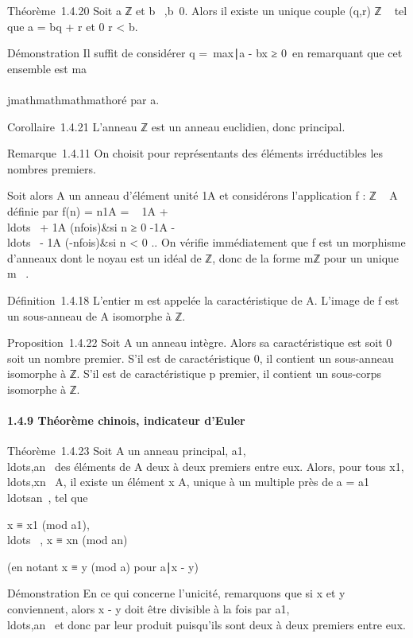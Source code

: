Théorème~1.4.20 Soit a \in ℤ et b \in {}~,b\neq~0. Alors il existe un unique
couple (q,r) \in ℤ \times {}~ tel que a = bq + r et 0 \leq r \textless{} b.

Démonstration Il suffit de considérer q =\
max\x∣a - bx ≥
0\ en remarquant que cet ensemble est ma\\\\jmathmathmathmathoré par a.

Corollaire~1.4.21 L'anneau ℤ est un anneau euclidien, donc principal.

Remarque~1.4.11 On choisit pour représentants des éléments irréductibles
les nombres premiers.

Soit alors A un anneau d'élément unité 1A et considérons
l'application f : ℤ \rightarrow~ A définie par f(n) = n1A =
\left \ \cases
1A +
\\ldots~ +
1A (n\text fois)&si n ≥ 0
\cr -1A
-\\ldots~ -
1A (-n\text fois)&si n \textless{} 0 
\right .. On vérifie immédiatement que f est un morphisme
d'anneaux dont le noyau est un idéal de ℤ, donc de la forme mℤ pour un
unique m \in \mathbb{N}~.

Définition~1.4.18 L'entier m est appelée la caractéristique de A.
L'image de f est un sous-anneau de A isomorphe à ℤ\diagupmℤ.

Proposition~1.4.22 Soit A un anneau intègre. Alors sa caractéristique
est soit 0 soit un nombre premier. S'il est de caractéristique 0, il
contient un sous-anneau isomorphe à ℤ. S'il est de caractéristique p
premier, il contient un sous-corps isomorphe à ℤ\diaguppℤ.

\paragraph{1.4.9 Théorème chinois, indicateur d'Euler}

Théorème~1.4.23 Soit A un anneau principal,
a1,\\ldots,an~
des éléments de A deux à deux premiers entre eux. Alors, pour tous
x1,\\ldots,xn~
\in A, il existe un élément x \in A, unique à un multiple près de a =
a1\\ldotsan~,
tel que

x ≡ x1
(mod\,\,a1),\quad
\\ldots~\quad
, x ≡ xn (mod\,\,an)

(en notant x ≡ y (mod\,\,a) pour
a∣x - y)

Démonstration En ce qui concerne l'unicité, remarquons que si x et y
conviennent, alors x - y doit être divisible à la fois par
a1,\\ldots,an~
et donc par leur produit puisqu'ils sont deux à deux premiers entre eux.

